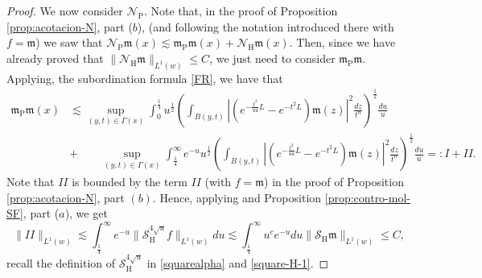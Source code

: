 \documentclass[11pt, a4paper,leqno]{amsart}
\newcommand{\mm}{\mathfrak{m}}
\theoremstyle{plain}
\theoremstyle{definition}
\theoremstyle{remark}
\numberwithin{equation}{section}
\def \Scal{ \mathcal{S} }
\def \hh{ \mathrm{H} }
\def \pp{ \mathrm{P} }
\def \Ncal { \mathcal{N} }
\begin{document}
\begin{proof}
We now consider  $\Ncal_{\pp}$. Note that, in the proof of Proposition \ref{prop:acotacion-N}, part ($b$), (and following the notation introduced there with $f=\mm$) we saw that
$\Ncal_{\pp}\mm(x)\lesssim \mathfrak{m}_{\pp}\mm(x)+\Ncal_{\hh}\mm(x).$
Then, since we have already proved that $\|\Ncal_{\hh}\mm\|_{L^1(w)}\leq C$, we just need to consider $\mathfrak{m}_{\pp}\mm$. Applying,  the subordination formula \eqref{FR},  we have that
\begin{align*}
\mathfrak{m}_{\pp}\mm(x)&\lesssim
\sup_{(y,t)\in \Gamma(x)} \int_{0}^{\frac{1}{4}}u^{\frac{1}{2}}\left(\int_{B(y,t)}|(e^{-\frac{t^2}{4u}L}-e^{-t^2L})\mm(z)|^2\frac{dz}{t^n}\right)^{\frac{1}{2}}\frac{du}{u}
\\&
+\qquad
\sup_{(y,t)\in \Gamma(x)} \int_{\frac{1}{4}}^{\infty}e^{-u}u^{\frac{1}{2}}\left(\int_{B(y,t)}|(e^{-\frac{t^2}{4u}L}-e^{-t^2L})\mm(z)|^2\frac{dz}{t^n}\right)^{\frac{1}{2}}\frac{du}{u}=:I+II.
\end{align*}
Note that  $II$ is bounded by the term $II$ (with $f=\mm$) in the proof of Proposition  \ref{prop:acotacion-N}, part $(b)$. Hence, applying \cite[Proposition 3.2]{MartellPrisuelos} and Proposition \ref{prop:contro-mol-SF}, part ($a$),  we get
$$
\|II\|_{L^1(w)}\lesssim \int_{\frac{1}{4}}^{\infty}e^{-u}\|\Scal_{\hh}^{4\sqrt{u}}f\|_{L^1(w)}du
\lesssim \int_{\frac{1}{4}}^{\infty}u^{c}e^{-u}du\|\Scal_{\hh}\mm\|_{L^1(w)}\leq C,
$$
recall the definition of $\Scal_{\hh}^{4\sqrt{u}}$ in \eqref{squarealpha} and \eqref{square-H-1}.  


\end{proof}
\end{document}

